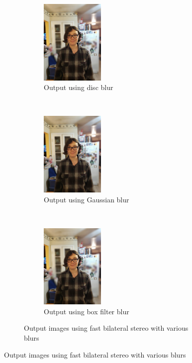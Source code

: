 \documentclass[10pt,twocolumn,letterpaper]{article}
\begin{document}
\begin{figure}[t!]
    \begin{subfigure}[t!]{\textwidth}
    \centering
    \begin{subfigure}[t!]{0.33\textwidth}
        \centering
        \includegraphics[width=1.2in]{bin/output_discblur.jpg}
        \caption{Output using disc blur}
    \end{subfigure}%
    ~
    \begin{subfigure}[t!]{0.33\textwidth}
        \centering
        \includegraphics[width=1.2in]{bin/output_gaussianblur.jpg}
        \caption{Output using Gaussian blur}
    \end{subfigure}%
    ~
    \begin{subfigure}[t!]{0.33\textwidth}
        \centering
        \includegraphics[width=1.2in]{bin/output_boxblur.jpg}
        \caption{Output using box filter blur}
    \end{subfigure}
    \caption*{Output images using fast bilateral stereo with various blurs}
    \end{subfigure}
    \label{fig:outputs}
\end{figure}
\end{document}
